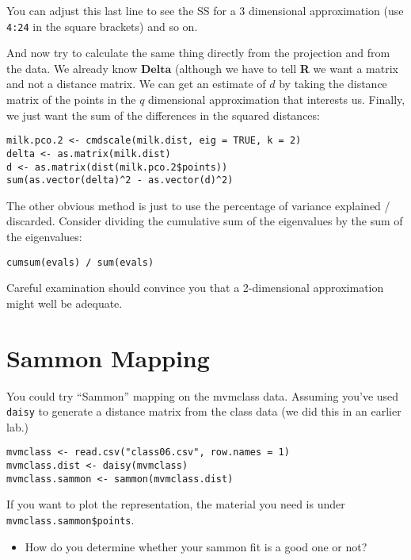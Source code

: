 You can adjust this last line to see the SS for a 3 dimensional approximation (use \texttt{4:24} in the square brackets) and so on.

And now try to calculate the same thing directly from the projection and from the data.   We already know $\boldsymbol{Delta}$ (although we have to tell \textbf{R} we want a matrix and not a distance matrix.   We can get an estimate of $d$ by taking the distance matrix of the points in the $q$ dimensional approximation that interests us.   Finally, we just want the sum of the differences in the squared distances:

\begin{verbatim}
milk.pco.2 <- cmdscale(milk.dist, eig = TRUE, k = 2)
delta <- as.matrix(milk.dist)
d <- as.matrix(dist(milk.pco.2$points))
sum(as.vector(delta)^2 - as.vector(d)^2)
\end{verbatim}


The other obvious method is just to use the percentage of variance explained / discarded.   Consider dividing the cumulative sum of the eigenvalues by the sum of the eigenvalues:

\begin{verbatim}
cumsum(evals) / sum(evals)
\end{verbatim}


Careful examination should convince you that a 2-dimensional approximation might well be adequate.


\section{Sammon Mapping}

You could try ``Sammon'' mapping on the mvmclass data.   Assuming you've used \texttt{daisy} to generate a distance matrix from the class data (we did this in an earlier lab.)

\begin{verbatim}
mvmclass <- read.csv("class06.csv", row.names = 1)
mvmclass.dist <- daisy(mvmclass)
mvmclass.sammon <- sammon(mvmclass.dist)
\end{verbatim}

If you want to plot the representation, the material you need is under \verb+mvmclass.sammon$points+.

\begin{itemize}
\item How do you determine whether your sammon fit is a good one or not?
\end{itemize}

